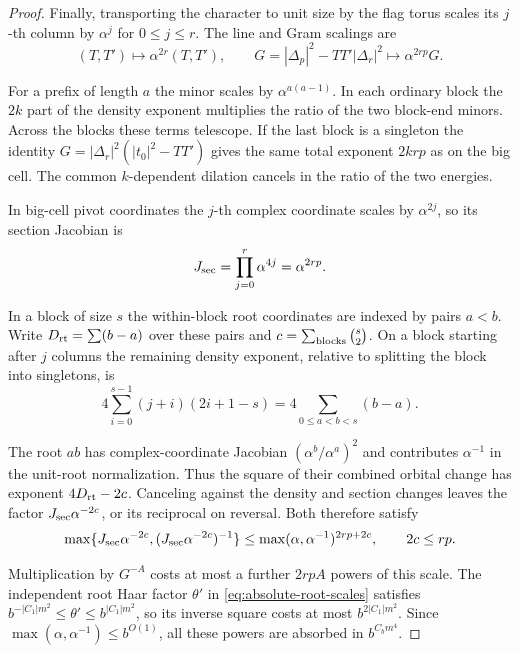 \begin{proof}
Finally, transporting the character to unit size by the flag torus
scales its \(j\)-th column by \(\alpha^j\) for \(0\le j\le r\).
The line and Gram scalings are
\[
 (T,T')\longmapsto\alpha^{2r}(T,T'),\qquad
    G=|\Delta_p|^2-TT'|\Delta_r|^2\longmapsto\alpha^{2rp}G .
\]

For a prefix of length \(a\) the minor scales by
\(\alpha^{a(a-1)}\). In each ordinary block the \(2k\) part of the
density exponent multiplies the ratio of the two block-end minors.
Across the blocks these terms telescope. If the last block is a
singleton the identity \(G=|\Delta_r|^2(|t_0|^2-TT')\) gives the
same total exponent \(2krp\) as on the big cell. The common
\(k\)-dependent dilation cancels in the ratio of the two energies.

In big-cell pivot coordinates the \(j\)-th complex coordinate
scales by \(\alpha^{2j}\), so its section Jacobian is
\[
             J_{\rm sec}=\prod_{j=0}^r\alpha^{4j}=\alpha^{2rp}.
\]

In a block of size \(s\) the within-block root coordinates are
indexed by pairs \(a<b\). Write \(D_{\rm rt}=\sum(b-a)\) over these pairs and
\(c=\sum_{\rm blocks}\binom{s}{2}\). On a block starting after
\(j\) columns the remaining density exponent, relative to splitting
the block into singletons, is
\[
 4\sum_{i=0}^{s-1}(j+i)(2i+1-s)
       =4\sum_{0\le a<b<s}(b-a).
\]

The root \(ab\) has complex-coordinate Jacobian
\((\alpha^b/\alpha^a)^2\) and contributes \(\alpha^{-1}\)
in the unit-root normalization. Thus the square of their
combined orbital change has exponent \(4D_{\rm rt}-2c\).
Canceling against the density and section changes leaves the
factor \(J_{\rm sec}\alpha^{-2c}\), or its reciprocal on reversal. Both therefore satisfy
\[
 \max\{J_{\rm sec}\alpha^{-2c},(J_{\rm sec}\alpha^{-2c})^{-1}\}
   \le\max(\alpha,\alpha^{-1})^{2rp+2c},\qquad 2c\le rp .
\]

Multiplication by \(G^{-A}\) costs at most a further \(2rpA\)
powers of this scale. The independent root Haar factor \(\theta'\)
in \eqref{eq:absolute-root-scales} satisfies
\(b^{-|C_1|m^2}\le\theta'\le b^{|C_1|m^2}\), so its inverse square
costs at most \(b^{2|C_1|m^2}\). Since
\(\max(\alpha,\alpha^{-1})\le b^{O(1)}\), all these powers are
absorbed in \(b^{C_bm^4}\).
\end{proof}
